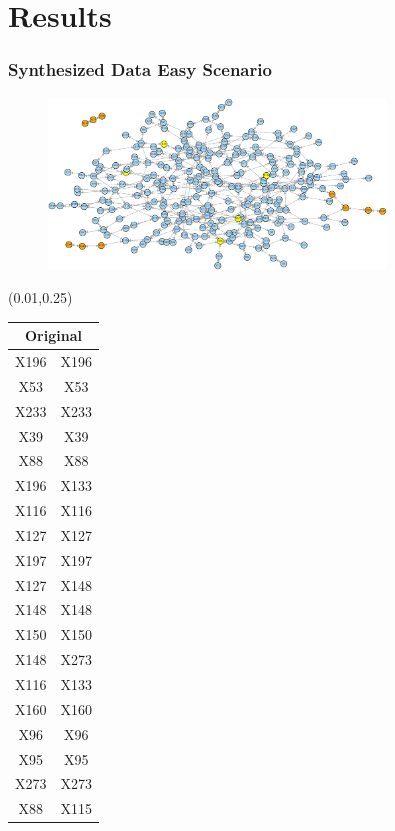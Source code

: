 \documentclass{beamer}
\newcommand{\boz}{\cellcolor{pathwaynode}}
\newcommand{\ghool}{\cellcolor{independentnode}}
\begin{document}
\section{Results}
\begin{frame}
  \frametitle{Synthesized Data Easy Scenario}
  \begin{figure}
    \includegraphics[width=0.8\textwidth]{synthesized-easy}
  \end{figure}
  \begin{textblock*}{\paperwidth}(0.01\textwidth,0.25\textheight)
    \raggedright 
    \tiny
    \begin{tabular}{| c c |}
      \hline
\toprule
\multicolumn{2}{c}{Original} \\ 
\midrule \hline
\boz X196   &  \boz X196  \\ \hline
X53   &  X53  \\ \hline
X233   &  X233  \\ \hline
X39   &  X39  \\ \hline
\ghool X88   &  \ghool X88  \\ \hline
\boz X196   &  \boz X133  \\ \hline
\boz X116   &  \boz X116  \\ \hline
X127   &  X127  \\ \hline
X197   &  X197  \\ \hline
X127   &  X148  \\ \hline
X148   &  X148  \\ \hline
\boz X150   &  \boz X150  \\ \hline
X148   &  X273  \\ \hline
\boz X116   &  \boz X133  \\ \hline
X160   &  X160  \\ \hline
\ghool X96   &  \ghool X96  \\ \hline
X95   &  X95  \\ \hline
X273   &  X273  \\ \hline
\ghool X88   &  X115  \\ \hline

\end{tabular}
\end{textblock*}
\end{frame}
\end{document}

